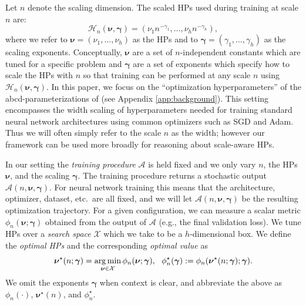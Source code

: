 \documentclass{article} %
\newcommand{\hp}{\nu}                             %
\newcommand{\bhp}{\bm{\nu}}                       %
\newcommand{\hpexp}{\gamma}                       %
\newcommand{\bhpexp}{\bm{\gamma}}                 %
\newcommand{\scaledhps}{\mathcal{H}}
\newcommand{\searchspace}{\mathcal{X}}            %
\newcommand{\numhps}{h}
\newcommand{\algo}{\mathcal{A}}
\renewcommand{\citet}[1]{\cite{#1}}
\begin{document}
Let $n$ denote the scaling dimension. The scaled HPs used during training at scale $n$ are:
\[
    \scaledhps_n(\bhp, \bhpexp) = (\hp_1 n^{-\hpexp_1}, \ldots, \hp_{\numhps} n^{-\hpexp_{\numhps}}),
\]
where we refer to $\bhp = (\hp_1, \ldots, \hp_{\numhps})$ as the HPs and to $\bhpexp = (\hpexp_1, \ldots, \hpexp_{\numhps})$ as the scaling exponents. Conceptually, $\bhp$ are a set of $n$-independent constants which are tuned for a specific problem and $\bhpexp$ are a set of exponents which specify how to scale the HPs with $n$ so that training can be performed at any scale $n$ using $\scaledhps_n(\bhp, \bhpexp)$. 
In this paper, we focus on the ``optimization hyperparameters'' of the abcd-parameterizations of \citet{yang2023tensor} (see Appendix \ref{app:background}). This setting encompasses the width scaling of hyperparameters needed for training standard neural network architectures using common optimizers such as SGD and Adam. Thus we will often simply refer to the scale $n$ as the width; however our framework can be used more broadly for reasoning about scale-aware HPs.

In our setting the \emph{training procedure} $\algo$ is held fixed and we only vary $n$, the HPs $\bhp$, and the scaling $\bhpexp$. The training procedure returns a stochastic output $\algo(n, \bhp, \bhpexp)$. For neural network training this means that the architecture, optimizer, dataset, etc.\ are all fixed, and we will let $\algo(n, \bhp, \bhpexp)$ be the resulting optimization trajectory. For a given configuration, we can measure a scalar metric $\phi_n(\bhp; \bhpexp)$ obtained from the output of $\algo$ (e.g., the final validation loss). We tune HPs over a \emph{search space} $\searchspace$ which we take to be a $\numhps$-dimensional box. 
We define the \emph{optimal HPs} and the corresponding \emph{optimal value} as
\[
    \bhp^\star(n; \bhpexp) = \argmin_{\bhp \in \searchspace} \phi_n(\bhp; \bhpexp),~~ \phi_n^\star(\bhpexp) := \phi_n(\bhp^\star(n; \bhpexp); \bhpexp).
\]
We omit the exponents $\bhpexp$ when context is clear, and abbreviate the above as $\phi_n(\cdot)$, $\bhp^\star(n)$, and $\phi_n^\star$.  
 
\end{document}
